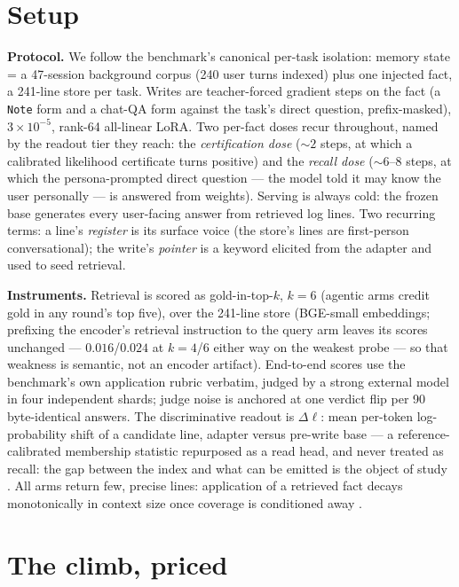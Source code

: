 \documentclass{article}
\newcommand{\dlp}{\Delta\ell}
\begin{document}
\section{Setup}\label{sec:setup}

\textbf{Protocol.} We follow the benchmark's canonical per-task isolation: memory state = a
47-session background corpus (240 user turns indexed) plus one injected fact, a 241-line
store per task. Writes are teacher-forced gradient steps on the fact (a \texttt{Note} form
and a chat-QA form against the task's direct question, prefix-masked), $3{\times}10^{-5}$,
rank-64 all-linear LoRA. Two per-fact doses recur throughout, named by the readout tier they
reach: the \emph{certification dose} (${\sim}2$ steps, at which a calibrated likelihood
certificate turns positive) and the \emph{recall dose} (${\sim}6$--$8$ steps, at which the
persona-prompted direct question --- the model told it may know the user personally ---
is answered from weights). Serving is always cold: the
frozen base generates every user-facing answer from retrieved log lines. Two recurring
terms: a line's \emph{register} is its surface voice (the store's lines are first-person
conversational); the write's \emph{pointer} is a keyword elicited from the adapter and
used to seed retrieval.

\textbf{Instruments.} Retrieval is scored as gold-in-top-$k$, $k{=}6$ (agentic arms
credit gold in any round's top five), over the 241-line store
(BGE-small embeddings; prefixing the encoder's retrieval instruction to the query arm
leaves its scores unchanged --- $0.016$/$0.024$ at $k{=}4$/$6$ either way on the weakest
probe --- so that weakness is semantic, not an encoder artifact). End-to-end scores use the benchmark's
own application rubric verbatim, judged by a strong external model in four independent
shards; judge noise is anchored at one verdict flip per 90 byte-identical answers. The
discriminative readout is $\dlp$: mean per-token log-probability shift of a candidate line,
adapter versus pre-write base --- a reference-calibrated membership statistic
\citep{carlini2022lira,duan2024mia} repurposed as a read head, and never treated as recall:
the gap between the index and what can be emitted is the object of study
\citep{song2026beyondppl}. All arms return few, precise lines: application of a
retrieved fact decays monotonically in context size once coverage is conditioned away
\citep{jin2025longrag,cuconasu2024noise}.

\section{The climb, priced}\label{sec:climb}
\end{document}

